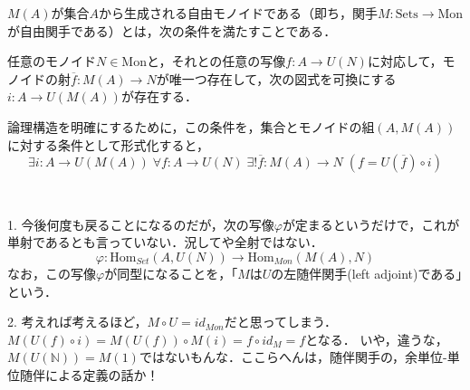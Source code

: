 \documentclass[uplatex, dvipdfmx]{jsarticle}
\begin{document}
\begin{definition*}
    $M(A)$が集合$A$から生成される自由モノイドである（即ち，関手$M:\mathrm{Sets}\to\mathrm{Mon}$が自由関手である）とは，次の条件を満たすことである．

    任意のモノイド$N\in\mathrm{Mon}$と，それとの任意の写像$f:A\to U(N)$に対応して，モノイドの射$\overline{f}:M(A)\to N$が唯一つ存在して，次の図式を可換にする$i:A\to U(M(A))$が存在する．
    \begin{center}
    \end{center}
    論理構造を明確にするために，この条件を，集合とモノイドの組$(A,M(A))$に対する条件として形式化すると，
    \[ \exists i:A\to U(M(A))\; \forall f:A\to U(N)\; \exists! \overline{f}:M(A)\to N \; (f=U(\overline{f})\circ i) \]
    \rightline{$\blacksquare$}
\end{definition*}
\begin{remark*}　

    1. 今後何度も戻ることになるのだが，次の写像$\varphi$が定まるというだけで，これが単射であるとも言っていない．況してや全射ではない．
    \[ \varphi:\mathrm{Hom}_{Set}(A,U(N))\to\mathrm{Hom}_{Mon}(M(A),N) \]
    なお，この写像$\varphi$が同型になることを，「$M$は$U$の左随伴関手(left adjoint)である」という．

    2. 考えれば考えるほど，$M\circ U=id_{Mon}$だと思ってしまう．$M(U(f)\circ i)=M(U(f))\circ M(i)=f\circ id_M=f$となる．
    いや，違うな，$M(U(\mathbb{N}))=M(1)$ではないもんな．ここらへんは，随伴関手の，余単位-単位随伴による定義の話か！
\end{remark*}
\end{document}
